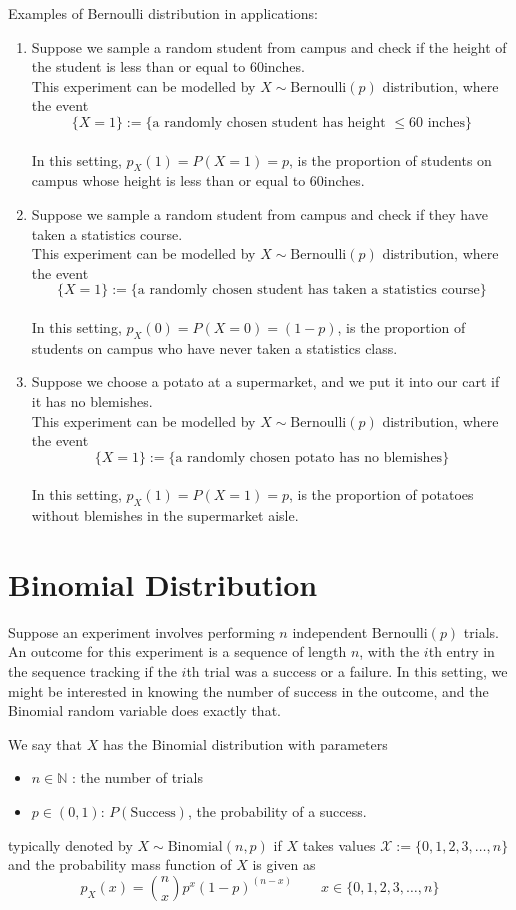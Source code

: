 Examples of Bernoulli distribution in applications:
\begin{enumerate}
    \item Suppose we sample a random student from campus and check if the height of the student is less than or equal to 60inches. 
    \\
    This experiment can be modelled by $X\sim \text{Bernoulli}(p)$ distribution, where the event 
    $$\{X=1\} := \{\text{a randomly chosen student has height $\le 60$ inches}\}$$
    \\
    In this setting, $p_X(1) = P(X=1) = p$, is the proportion of students on campus whose height is less than or equal to 60inches. 
    \item  Suppose we sample a random student from campus and check if they have taken a statistics course. 
    \\
    This experiment can be modelled by $X\sim \text{Bernoulli}(p)$ distribution, where the event 
    $$\{X=1\} := \{\text{a randomly chosen student has taken a statistics course}\}$$
    \\
    In this setting, $p_X(0) = P(X=0) = (1-p)$, is the proportion of students on campus who have never taken a statistics class. 
    \item  Suppose we choose a potato at a supermarket, and we put it into our cart if it has no blemishes.  
    \\
    This experiment can be modelled by $X\sim \text{Bernoulli}(p)$ distribution, where the event 
    $$\{X=1\} := \{\text{a randomly chosen potato has no blemishes}\}$$
    \\
    In this setting, $p_X(1) = P(X=1) = p$, is the proportion of potatoes without blemishes in the supermarket aisle. 
\end{enumerate}

\section[Binomial Distribution]{Binomial Distribution}
Suppose an experiment involves performing $n$ independent $\text{Bernoulli}(p)$ trials. An outcome for this experiment is a sequence of length $n$, with the $i$th entry in the sequence tracking if the $i$th trial was a success or a failure. In this setting, we might be interested in knowing the number of success in the outcome, and the Binomial random variable does exactly that. 
\\

\begin{defn}
    We say that $X$ has the Binomial distribution with parameters
    \begin{itemize}
        \item $n\in \mathbb{N}$ : the number of trials
        \item $p\in (0,1)$: $P(\text{Success})$, the probability of a success. 
    \end{itemize}
    typically denoted by $X \sim \text{Binomial}(n, p)$ if $X$ takes values $\mathcal{X}:= \{0,1, 2, 3, \dots, n\}$ and the probability mass function of $X$ is given as
    $$p_X(x) = {n \choose x} p^x(1-p)^{(n-x)}\quad \quad x\in \{0,1, 2, 3, \dots, n\}$$
\end{defn}

